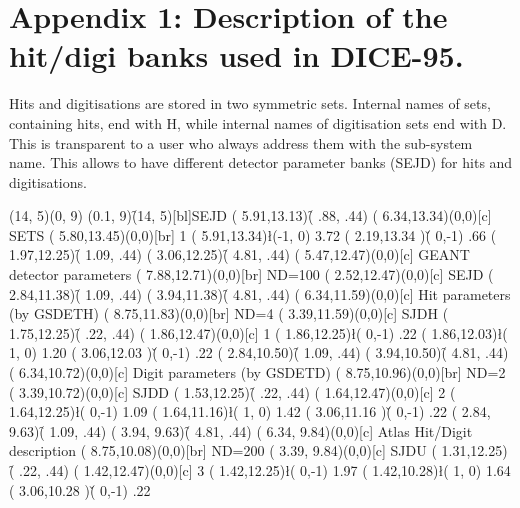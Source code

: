 
\newpage 
\section*{Appendix 1: Description of the hit/digi banks used in DICE-95.}

\vspace{1cm}
Hits and digitisations are stored in two symmetric sets. 
Internal names of sets, containing hits, end with H,
 while internal names of digitisation sets end with D. 
This is transparent to a user who always address them 
with the sub-system name. 
This allows to have different detector parameter banks (SEJD) for hits 
and digitisations.

\vspace{1cm}

\bp(14, 5)(0, 9)
{\small \sf 
\p(0.1, 9){\f(14, 5)[bl]{SEJD}}
\p( 5.91,13.13){\f(  .88,  .44){ }}
\p( 6.34,13.34){\m(0,0)[c] { SETS }}
\p( 5.80,13.45){\m(0,0)[br]{  1   }}
\p( 5.91,13.34){\l(-1, 0){ 3.72}}
\p( 2.19,13.34 ){\v( 0,-1){  .66}}
\p( 1.97,12.25){\f( 1.09,  .44){ }}
\p( 3.06,12.25){\f( 4.81,  .44){ }}
\p( 5.47,12.47){\m(0,0)[c] { GEANT detector parameters  }}
\p( 7.88,12.71){\m(0,0)[br]{ ND=100 }}
\p( 2.52,12.47){\m(0,0)[c] { SEJD }}
\p( 2.84,11.38){\f( 1.09,  .44){ }}
\p( 3.94,11.38){\f( 4.81,  .44){ }}
\p( 6.34,11.59){\m(0,0)[c] { Hit parameters (by GSDETH) }}
\p( 8.75,11.83){\m(0,0)[br]{ ND=4 }}
\p( 3.39,11.59){\m(0,0)[c] { SJDH }}
\p( 1.75,12.25){\f(  .22,  .44){ }}
\p( 1.86,12.47){\m(0,0)[c] { 1 }}
\p( 1.86,12.25){\l( 0,-1){  .22}}
\p( 1.86,12.03){\l( 1, 0){ 1.20}}
\p( 3.06,12.03 ){\v( 0,-1){  .22}}
\p( 2.84,10.50){\f( 1.09,  .44){ }}
\p( 3.94,10.50){\f( 4.81,  .44){ }}
\p( 6.34,10.72){\m(0,0)[c] { Digit parameters (by GSDETD) }}
\p( 8.75,10.96){\m(0,0)[br]{ ND=2 }}
\p( 3.39,10.72){\m(0,0)[c] { SJDD }}
\p( 1.53,12.25){\f(  .22,  .44){ }}
\p( 1.64,12.47){\m(0,0)[c] { 2 }}
\p( 1.64,12.25){\l( 0,-1){ 1.09}}
\p( 1.64,11.16){\l( 1, 0){ 1.42}}
\p( 3.06,11.16 ){\v( 0,-1){  .22}}
\p( 2.84, 9.63){\f( 1.09,  .44){ }}
\p( 3.94, 9.63){\f( 4.81,  .44){ }}
\p( 6.34, 9.84){\m(0,0)[c] { Atlas Hit/Digit description }}
\p( 8.75,10.08){\m(0,0)[br]{ ND=200 }}
\p( 3.39, 9.84){\m(0,0)[c] { SJDU }}
\p( 1.31,12.25){\f(  .22,  .44){ }}
\p( 1.42,12.47){\m(0,0)[c] { 3 }}
\p( 1.42,12.25){\l( 0,-1){ 1.97}}
\p( 1.42,10.28){\l( 1, 0){ 1.64}}
\p( 3.06,10.28 ){\v( 0,-1){  .22}}
}
\ep
 
